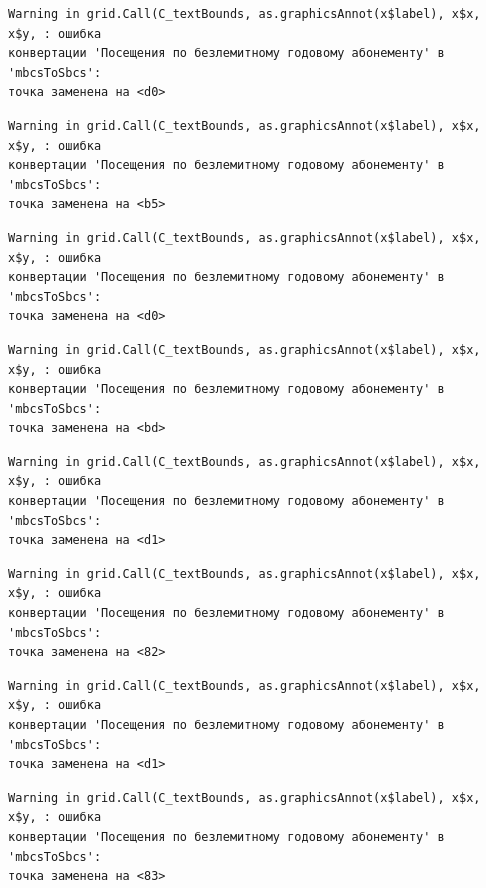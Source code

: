 \documentclass[
  letterpaper,
  DIV=11,
  numbers=noendperiod]{scrreprt}
\begin{document}
\begin{verbatim}
Warning in grid.Call(C_textBounds, as.graphicsAnnot(x$label), x$x, x$y, : ошибка
конвертации 'Посещения по безлемитному годовому абонементу' в 'mbcsToSbcs':
точка заменена на <d0>
\end{verbatim}

\begin{verbatim}
Warning in grid.Call(C_textBounds, as.graphicsAnnot(x$label), x$x, x$y, : ошибка
конвертации 'Посещения по безлемитному годовому абонементу' в 'mbcsToSbcs':
точка заменена на <b5>
\end{verbatim}

\begin{verbatim}
Warning in grid.Call(C_textBounds, as.graphicsAnnot(x$label), x$x, x$y, : ошибка
конвертации 'Посещения по безлемитному годовому абонементу' в 'mbcsToSbcs':
точка заменена на <d0>
\end{verbatim}

\begin{verbatim}
Warning in grid.Call(C_textBounds, as.graphicsAnnot(x$label), x$x, x$y, : ошибка
конвертации 'Посещения по безлемитному годовому абонементу' в 'mbcsToSbcs':
точка заменена на <bd>
\end{verbatim}

\begin{verbatim}
Warning in grid.Call(C_textBounds, as.graphicsAnnot(x$label), x$x, x$y, : ошибка
конвертации 'Посещения по безлемитному годовому абонементу' в 'mbcsToSbcs':
точка заменена на <d1>
\end{verbatim}

\begin{verbatim}
Warning in grid.Call(C_textBounds, as.graphicsAnnot(x$label), x$x, x$y, : ошибка
конвертации 'Посещения по безлемитному годовому абонементу' в 'mbcsToSbcs':
точка заменена на <82>
\end{verbatim}

\begin{verbatim}
Warning in grid.Call(C_textBounds, as.graphicsAnnot(x$label), x$x, x$y, : ошибка
конвертации 'Посещения по безлемитному годовому абонементу' в 'mbcsToSbcs':
точка заменена на <d1>
\end{verbatim}

\begin{verbatim}
Warning in grid.Call(C_textBounds, as.graphicsAnnot(x$label), x$x, x$y, : ошибка
конвертации 'Посещения по безлемитному годовому абонементу' в 'mbcsToSbcs':
точка заменена на <83>
\end{verbatim}
\end{document}
